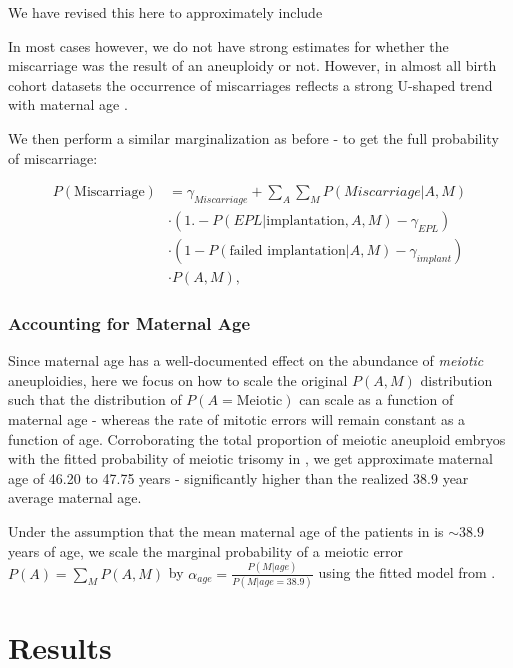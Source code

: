 \documentclass{article}
\begin{document}
We have revised this here to approximately include

In most cases however, we do not have strong estimates for whether the miscarriage was the result of an aneuploidy or not. However, in almost all birth cohort datasets the occurrence of miscarriages reflects a strong U-shaped trend  with maternal age \citep{Gruhn2019-al}. 

We then perform a similar marginalization as before - to get the full probability of miscarriage: 

\begin{equation}
\begin{aligned}
P(\text{Miscarriage}) &=  \gamma_{Miscarriage} + \sum_{A}\sum_{M} P(Miscarriage | A,M)\\
&\cdot (1. - P(EPL | \text{implantation}, A, M) - \gamma_{EPL})\\
&\cdot (1 - P(\text{failed implantation} | A, M) - \gamma_{implant})\\ 
&\cdot P(A, M),
\end{aligned}
\end{equation}

\subsubsection*{Accounting for Maternal Age} 

Since maternal age has a well-documented effect on the abundance of \textit{meiotic} aneuploidies, here we focus on how to scale the original $P(A,M)$ distribution such that the distribution of $P(A = \text{Meiotic})$ can scale as a function of maternal age - whereas the rate of mitotic errors will remain constant as a function of age. Corroborating the total proportion of meiotic aneuploid embryos with the fitted probability of meiotic trisomy in \citep{Gruhn2019-al}, we get approximate maternal age of 46.20 to 47.75 years - significantly higher than the realized 38.9 year average maternal age. 

Under the assumption that the mean maternal age of the patients in \citep{McCoy2023-dg} is $\sim 38.9$ years of age, we scale the marginal probability of a meiotic error $P(A) = \sum_M P(A,M)$ by $\alpha_{age} = \frac{P(M | age)}{P(M | age = 38.9)}$ using the fitted model from \citep{Gruhn2019-al}.

\section*{Results}
\end{document}
